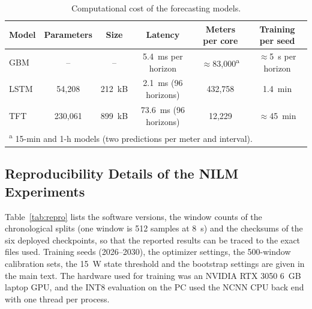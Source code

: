 \begin{table}[H]
\centering
\caption{Computational cost of the forecasting models.}
\label{tab:forecast_compute}
\small
\begin{tabular}{lccccc}
\toprule
Model & Parameters & Size & Latency & Meters per core & Training per seed \\
\midrule
GBM & -- & -- & 5.4~ms per horizon & $\approx$83{,}000\textsuperscript{a} & $\approx$5~s per horizon \\
LSTM & 54{,}208 & 212~kB & 2.1~ms (96 horizons) & 432{,}758 & 1.4~min \\
TFT & 230{,}061 & 899~kB & 73.6~ms (96 horizons) & 12{,}229 & $\approx$45~min \\
\bottomrule
\multicolumn{6}{l}{\footnotesize \textsuperscript{a} 15-min and 1-h models (two predictions per meter and interval).} \\
\end{tabular}
\end{table}


\subsection*{Reproducibility Details of the NILM Experiments}
Table~\ref{tab:repro} lists the software versions, the window counts of the chronological splits (one window is 512 samples at 8~s) and the checksums of the six deployed checkpoints, so that the reported results can be traced to the exact files used. Training seeds (2026--2030), the optimizer settings, the 500-window calibration sets, the 15~W state threshold and the bootstrap settings are given in the main text. The hardware used for training was an NVIDIA RTX 3050 6~GB laptop GPU, and the INT8 evaluation on the PC used the NCNN CPU back end with one thread per process.

